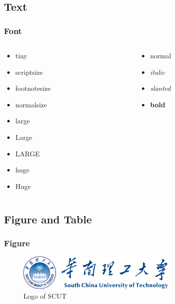 \documentclass[
    10pt,
    pdf,
    UTF8,
    aspectratio=169
]{beamer}
\begin{document}
\subsection{Text}

\begin{frame}
    \frametitle{Font}
    \begin{columns}
        \begin{column}{0.5\textwidth}
            \begin{itemize}
                \item {\tiny tiny}
                \item {\scriptsize scriptsize}
                \item {\footnotesize footnotesize}
                \item {\normalsize normalsize}
                \item {\large large}
                \item {\Large Large}
                \item {\LARGE LARGE}
                \item {\huge huge}
                \item {\Huge Huge}
            \end{itemize}
        \end{column}
        \begin{column}{0.5\textwidth}
            \begin{itemize}
                \item normal
                \item \textit{italic}
                \item \textsl{slanted}
                \item \textbf{bold}
            \end{itemize}
        \end{column}
    \end{columns}
\end{frame}

\subsection{Figure and Table}

\begin{frame}
    \frametitle{Figure}
    \begin{figure}
        \centering
        \includegraphics[width=0.7\textwidth]{./img/logo.png}
        \caption{Logo of SCUT}
        \label{fig:logo}
    \end{figure}
\end{frame}
\end{document}
